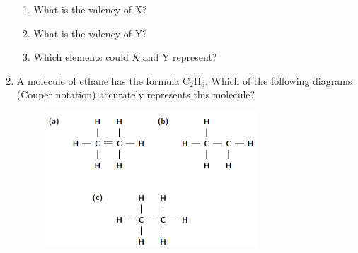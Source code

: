 \begin{enumerate}[noitemsep, label=\textbf{\arabic*}. ]
    \addtocounter{footnote}{-0}
    \label{m38689*id148261}\begin{enumerate}[noitemsep, label=\textbf{\alph*}. ] 
            \label{m38689*uid181}\item What is the valency of \begin{math}\mathrm{X}\end{math}?
\label{m38689*uid182}\item What is the valency of \begin{math}\mathrm{Y}\end{math}?
\label{m38689*uid183}\item Which elements could \begin{math}\mathrm{X}\end{math} and \begin{math}\mathrm{Y}\end{math} represent?
\end{enumerate}
                \label{m38689*uid184}\item A molecule of ethane has the formula \begin{math}\mathrm{C}{}_{2}\mathrm{H}{}_{6}\end{math}. Which of the following diagrams (Couper notation) accurately represents this molecule?

    \setcounter{subfigure}{0}


	\begin{figure}[H] %
    \begin{center}
    \label{m38689*id148343!!!underscore!!!media}\label{m38689*id148343!!!underscore!!!printimage}\includegraphics[width=300px]{col11305.imgs/m38689_CG11C1_028.png} %
        
      \vspace{2pt}
    \vspace{.1in}
    
    \end{center}

 \end{figure}   


\end{enumerate}
